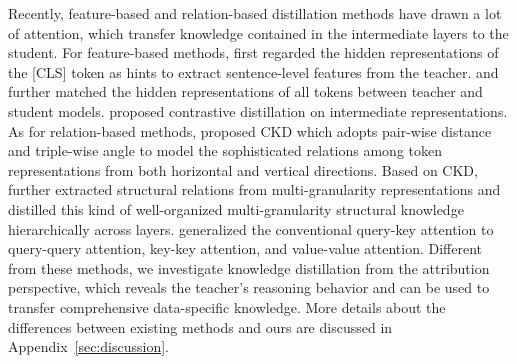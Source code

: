 \documentclass[11pt]{article}
\begin{document}
Recently, feature-based and relation-based distillation methods have drawn a lot of attention, which transfer knowledge contained in the intermediate layers to the student. For feature-based methods, \citet{sun-etal-2019-patient} first regarded the hidden representations of the [CLS] token as hints to extract sentence-level features from the teacher. \citet{jiao-etal-2020-tinybert} and \citet{sun-etal-2020-mobilebert} further matched the hidden representations of all tokens between teacher and student models. \citet{sun-etal-2020-contrastive} proposed contrastive distillation on intermediate representations. As for relation-based methods, \citet{park-etal-2021-distilling} proposed CKD which adopts pair-wise distance and triple-wise angle to model the sophisticated relations among token representations from both horizontal and vertical directions. Based on CKD, \citet{liu-etal-2022-multi-granularity} further extracted structural relations from multi-granularity representations and distilled this kind of well-organized multi-granularity structural knowledge hierarchically across layers. \citet{wang2020minilm,wang-etal-2021-minilmv2} generalized the conventional query-key attention to query-query attention, key-key attention, and value-value attention. 
Different from these methods, we investigate knowledge distillation from the attribution perspective, which reveals the teacher's reasoning behavior and can be used to transfer comprehensive data-specific knowledge. More details about the differences between existing methods and ours are discussed in Appendix~\ref{sec:discussion}.
\end{document}
